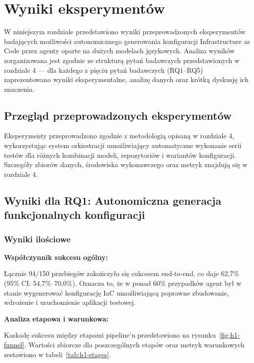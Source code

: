 \clearpage %
\section{Wyniki eksperymentów}

W niniejszym rozdziale przedstawiono wyniki przeprowadzonych eksperymentów badających możliwości autonomicznego generowania konfiguracji Infrastructure as Code przez agenty oparte na dużych modelach językowych. Analiza wyników zorganizowana jest zgodnie ze strukturą pytań badawczych przedstawionych w rozdziale 4 — dla każdego z pięciu pytań badawczych (RQ1–RQ5) zaprezentowano wyniki eksperymentalne, analizę danych oraz krótką dyskusję ich znaczenia.

\subsection{Przegląd przeprowadzonych eksperymentów}

Eksperymenty przeprowadzono zgodnie z metodologią opisaną w rozdziale 4, wykorzystując system orkiestracji umożliwiający automatyczne wykonanie serii testów dla różnych kombinacji modeli, repozytoriów i wariantów konfiguracji. Szczegóły zbiorów danych, środowiska wykonawczego oraz metryk znajdują się w rozdziale 4.

\subsection{Wyniki dla RQ1: Autonomiczna generacja funkcjonalnych konfiguracji}

\subsubsection{Wyniki ilościowe}

\textbf{Współczynnik sukcesu ogólny:}

Łącznie 94/150 przebiegów zakończyło się sukcesem end-to-end, co daje 62{,}7\% (95\% CI: 54{,}7\%--70{,}0\%). Oznacza to, że w ponad 60\% przypadków agent był w stanie wygenerować konfigurację IaC umożliwiającą poprawne zbudowanie, wdrożenie i uruchomienie aplikacji testowej.

\textbf{Analiza etapowa i warunkowa:}

Kaskadę sukcesu między etapami pipeline'u przedstawiono na rysunku~\ref{fig:h1-funnel}. Wartości zbiorcze dla poszczególnych etapów oraz metryk warunkowych zestawiono w tabeli~\ref{tab:h1-stages}.

